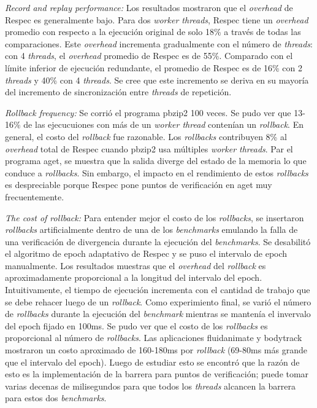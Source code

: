 \emph{Record and replay performance:} 
Los resultados mostraron que el \emph{overhead} de Respec es generalmente bajo. Para dos \emph{worker threads}, Respec tiene un \emph{overhead} promedio con respecto a la ejecución original de solo 18\% a través de todas las comparaciones. Este \emph{overhead} incrementa gradualmente con el número de \emph{threads}: con 4 \emph{threads}, el \emph{overhead} promedio de Respec es de 55\%. Comparado con el límite inferior de ejecución redundante, el promedio de Respec es de 16\% con 2 \emph{threads} y 40\% con 4 \emph{threads}. Se cree que este incremento se deriva en su mayoría del incremento de sincronización entre \emph{threads} de repetición.

\emph{Rollback frequency:} Se corrió el programa pbzip2 100 veces. Se pudo ver que 13-16\% de las ejecucuiones con más de un \emph{worker thread} contenían un \emph{rollback}. En general, el costo del \emph{rollback} fue razonable. Los \emph{rollbacks} contribuyen 8\% al \emph{overhead} total de Respec cuando pbzip2 usa múltiples \emph{worker threads}. Par el programa aget, se muestra que la salida diverge del estado de la memoria lo que conduce a \emph{rollbacks}. Sin embargo, el impacto en el rendimiento de estos \emph{rollbacks} es despreciable porque Respec pone puntos de verificación en aget muy frecuentemente.

\emph{The cost of rollback:} Para entender mejor el costo de los \emph{rollbacks}, se insertaron \emph{rollbacks} artificialmente dentro de una de los \emph{benchmarks} emulando la falla de una verificación de divergencia durante la ejecución del \emph{benchmarks}. Se desabilitó el algoritmo de epoch adaptativo de Respec y se puso el intervalo de epoch manualmente. Los resultados muestras que el \emph{overhead} del \emph{rollback} es aproximadamente proporcional a la longitud del intervalo del epoch. Intuitivamente, el tiempo de ejecución incrementa con el cantidad de trabajo que se debe rehacer luego de un \emph{rollback}. Como experimiento final, se varió el número de \emph{rollbacks} durante la ejecución del \emph{benchmark} mientras se mantenía el invervalo del epoch fijado en 100ms. Se pudo ver que el costo de los \emph{rollbacks} es proporcional al número de \emph{rollbacks}. Las aplicaciones fluidanimate y bodytrack mostraron un costo aproximado de 160-180ms por \emph{rollback} (69-80ms más grande que el intervalo del epoch). Luego de estudiar esto se encontró que la razón de esto es la implementación de la barrera para puntos de verificación; puede tomar varias decenas de milisegundos para que todos los \emph{threads} alcancen la barrera para estos dos \emph{benchmarks}.